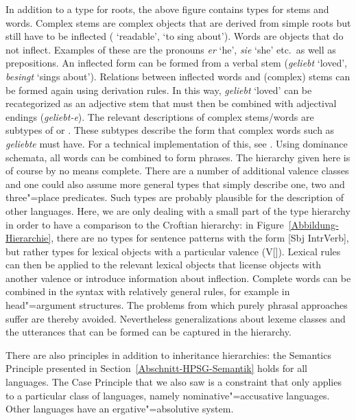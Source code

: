 In addition to a type for roots, the above figure contains types for stems and words. Complex stems are complex objects that are
derived from simple roots but still have to be inflected ( `readable', 
`to sing about'). Words are objects that do not inflect. Examples of these
are the pronouns \emph{er} `he', \emph{sie} `she' etc.\ as well as prepositions. An inflected form can be formed from a verbal stem
(\emph{geliebt} `loved', \emph{besingt} `sings about'). Relations between inflected words and (complex) stems can be formed again using derivation rules. 
In this way, \emph{geliebt} `loved' can be recategorized as an adjective stem that must then be combined with adjectival endings (\emph{geliebt-e}).
The relevant descriptions of complex stems/words are subtypes of 
or . These subtypes describe the form that complex words such as \emph{geliebte} must have. For a technical implementation of this, see
. Using dominance schemata, all words can be combined to form phrases. The hierarchy given here is of course by no means complete.
There are a number of additional valence classes and one could also assume more general types that simply describe one, two and three"=place predicates. 
Such types are probably plausible for the description of other languages. Here, we are only dealing with a small part of the type hierarchy in order to have
a comparison to the Croftian hierarchy: in Figure~\ref{Abbildung-Hierarchie}, there are no types for
sentence patterns with the form
[Sbj IntrVerb], but rather types for lexical objects with a particular valence
(V[\subcat {}]). Lexical rules can then be applied to the relevant lexical objects that license objects with another valence or introduce
information about inflection. Complete words can be combined in the syntax with relatively general rules, for example in head"=argument structures. The problems
from which purely phrasal approaches suffer are thereby avoided. Nevertheless generalizations about lexeme classes and the utterances that can be formed can be
captured in the hierarchy.

\addlines[2]
There are also principles in addition to inheritance hierarchies: the Semantics Principle presented in Section~\ref{Abschnitt-HPSG-Semantik} holds
for all languages. The Case Principle that we also saw is a constraint that only applies to a particular
class of languages, namely nominative"=accusative languages.
Other languages have an ergative"=absolutive system.

